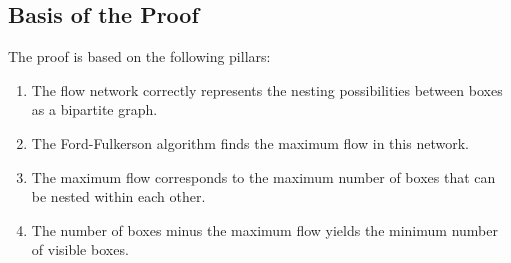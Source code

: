 \documentclass{article}
\begin{document}
    \subsection{Basis of the Proof}
        The proof is based on the following pillars:
        \begin{enumerate}
            \item The flow network correctly represents the nesting possibilities between boxes as a bipartite graph.
            \item The Ford-Fulkerson algorithm finds the maximum flow in this network.
            \item The maximum flow corresponds to the maximum number of boxes that can be nested within each other.
            \item The number of boxes minus the maximum flow yields the minimum number of visible boxes.
        \end{enumerate}
    
\end{document}
